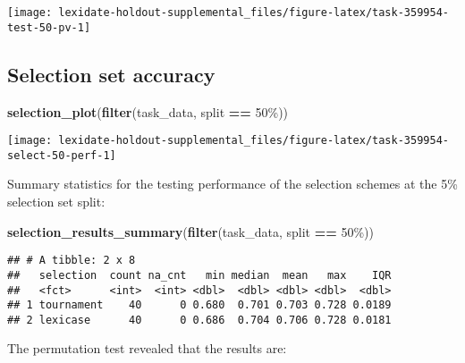 \documentclass[
]{book}
\newenvironment{Shaded}{\begin{snugshade}}{\end{snugshade}}
\newcommand{\FunctionTok}[1]{\textcolor[rgb]{0.13,0.29,0.53}{\textbf{#1}}}
\newcommand{\NormalTok}[1]{#1}
\newcommand{\SpecialCharTok}[1]{\textcolor[rgb]{0.81,0.36,0.00}{\textbf{#1}}}
\newcommand{\StringTok}[1]{\textcolor[rgb]{0.31,0.60,0.02}{#1}}
\begin{document}
\texttt{[image: lexidate-holdout-supplemental\_files/figure-latex/task-359954-test-50-pv-1]}

\hypertarget{selection-set-accuracy-7}{%
\subsection{Selection set accuracy}\label{selection-set-accuracy-7}}

\begin{Shaded}
\begin{Highlighting}[]
\FunctionTok{selection\_plot}\NormalTok{(}\FunctionTok{filter}\NormalTok{(task\_data, split }\SpecialCharTok{==} \StringTok{\textquotesingle{}50\%\textquotesingle{}}\NormalTok{))}
\end{Highlighting}
\end{Shaded}

\texttt{[image: lexidate-holdout-supplemental\_files/figure-latex/task-359954-select-50-perf-1]}

Summary statistics for the testing performance of the selection schemes at the 5\% selection set split:

\begin{Shaded}
\begin{Highlighting}[]
\FunctionTok{selection\_results\_summary}\NormalTok{(}\FunctionTok{filter}\NormalTok{(task\_data, split }\SpecialCharTok{==} \StringTok{\textquotesingle{}50\%\textquotesingle{}}\NormalTok{))}
\end{Highlighting}
\end{Shaded}

\begin{verbatim}
## # A tibble: 2 x 8
##   selection  count na_cnt   min median  mean   max    IQR
##   <fct>      <int>  <int> <dbl>  <dbl> <dbl> <dbl>  <dbl>
## 1 tournament    40      0 0.680  0.701 0.703 0.728 0.0189
## 2 lexicase      40      0 0.686  0.704 0.706 0.728 0.0181
\end{verbatim}

The permutation test revealed that the results are:
\end{document}
